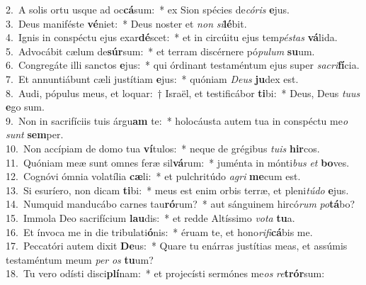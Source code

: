 {2.~}A solis ortu usque ad oc\textbf{cá}sum:~* ex Sion spécies de\textit{có}\textit{ris} \textbf{e}jus.\\
{3.~}Deus maniféste \textbf{vé}niet:~* Deus noster et \textit{non} \textit{si}\textbf{lé}bit.\\
{4.~}Ignis in conspéctu ejus exar\textbf{dé}scet:~* et in circúitu ejus tem\textit{pé}\textit{stas} \textbf{vá}lida.\\
{5.~}Advocábit cælum de\textbf{súr}sum:~* et terram discérnere pó\textit{pu}\textit{lum} \textbf{su}um.\\
{6.~}Congregáte illi sanctos \textbf{e}jus:~* qui órdinant testaméntum ejus super \textit{sa}\textit{cri}\textbf{fí}cia.\\
{7.~}Et annuntiábunt cæli justítiam \textbf{e}jus:~* quóniam \textit{De}\textit{us} \textbf{ju}dex est.\\
{8.~}Audi, pópulus meus, et loquar:~† Israël, et testificábor \textbf{ti}bi:~* Deus, Deus \textit{tu}\textit{us} \textbf{e}go sum.\\
{9.~}Non in sacrifíciis tuis árgu\textbf{am} te:~* holocáusta autem tua in conspéctu me\textit{o} \textit{sunt} \textbf{sem}per.\\
{10.~}Non accípiam de domo tua \textbf{ví}tulos:~* neque de grégibus \textit{tu}\textit{is} \textbf{hir}cos.\\
{11.~}Quóniam meæ sunt omnes feræ sil\textbf{vá}rum:~* juménta in mónti\textit{bus} \textit{et} \textbf{bo}ves.\\
{12.~}Cognóvi ómnia volatília \textbf{cæ}li:~* et pulchritúdo \textit{a}\textit{gri} \textbf{me}cum est.\\
{13.~}Si esuríero, non dicam \textbf{ti}bi:~* meus est enim orbis terræ, et pleni\textit{tú}\textit{do} \textbf{e}jus.\\
{14.~}Numquid manducábo carnes tau\textbf{ró}rum?~* aut sánguinem hircó\textit{rum} \textit{po}\textbf{tá}bo?\\
{15.~}Immola Deo sacrifícium \textbf{lau}dis:~* et redde Altíssimo \textit{vo}\textit{ta} \textbf{tu}a.\\
{16.~}Et ínvoca me in die tribulati\textbf{ó}nis:~* éruam te, et hono\textit{ri}\textit{fi}\textbf{cá}bis me.\\
{17.~}Peccatóri autem dixit \textbf{De}us:~* Quare tu enárras justítias meas, et assúmis testaméntum meum \textit{per} \textit{os} \textbf{tu}um?\\
{18.~}Tu vero odísti disci\textbf{plí}nam:~* et projecísti sermónes me\textit{os} \textit{re}\textbf{trór}sum:\\
